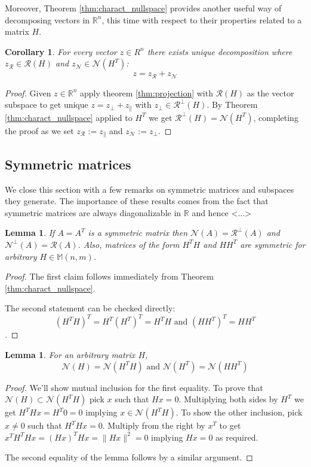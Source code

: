 \documentclass[a4paper]{article}
\theoremstyle{break}
\newtheorem{corollary}{Corollary}[theorem]
\newtheorem{lemma}[theorem]{Lemma}
\newcommand{\R}{\mathbb{R}}
\newcommand{\Nu}{\mathcal{N}}
\newcommand{\Ra}{\mathcal{R}}
\newcommand{\Mat}[2]{\mathbb{M}(#1, #2)}
\newcommand{\pll}{\parallel}
\begin{document}
Moreover, Theorem \ref{thm:charact_nullspace} provides another useful way of decomposing vectors in $\R^n$, this time with respect to their properties related to a matrix $H$.
\begin{corollary}
    For every vector $z \in R^n$ there exists unique decomposition where $z_\Ra \in \Ra(H)$ and $z_\Nu \in \Nu(H^T)$:
    $$z = z_\Ra + z_\Nu$$
\end{corollary}

\begin{proof}
    Given $ z \in \R^n$  apply theorem \ref{thm:projection} with $\Ra(H)$ as the vector subspace to get unique
    $ z = z_\perp + z_\pll$ with $z_\perp \in \Ra^\perp(H)$. By Theorem \ref{thm:charact_nullspace} applied to $H^T$ we get $\Ra^\perp(H) = \Nu(H^T)$, completing the proof as we set $z_\Ra := z_\pll$ and $z_\Nu := z_\perp$.
\end{proof}

\subsection{Symmetric matrices}
We close this section with a few remarks on symmetric matrices and subspaces they generate. The importance of these results comes from the fact that symmetric matrices are always diagonalizable in $\R$ and hence <...>

\begin{lemma} \label{lm:charact_sym_nullspace}
    If $A = A^T$ is a symmetric matrix then $\Nu(A) = \Ra^\perp(A)$ and $\Nu^\perp(A) = \Ra(A)$.
    Also, matrices of the form $H^T H$ and $H H^T$ are symmetric for arbitrary $H \in \Mat{n}{m}$.
\end{lemma}

\begin{proof}
    The first claim follows immediately from Theorem \ref{thm:charact_nullspace}.
    
    The second statement can be checked directly:
    $$(H^T H)^T = H^T (H^T)^T = H^T H \text{ and } (H H^T)^T = H H^T$$.
\end{proof}

\begin{lemma}
    \label{lem:nullspaces_hht}
    For an arbitrary matrix $H$,
    $$\Nu(H) = \Nu(H^T H) \text{ and } \Nu(H^T) = \Nu(H H^T)$$
\end{lemma}

\begin{proof}
    We'll show mutual inclusion for the first equality. To prove that $\Nu(H) \subset \Nu(H^T H)$ pick $x$ such that $Hx = 0$. Multiplying both sides by $H^T$ we get $ H^T H x = H^T 0 = 0 $ implying $x \in \Nu(H^T H) $. To show the other inclusion, pick $x \neq 0$ such that $H^T H x = 0$. Multiply from the right by $x^T$ to get $ x^T H^T H x = (Hx)^T Hx = \| Hx \|^2 = 0 $ implying $ Hx =0 $ as required.
    
    The second equality of the lemma follows by a similar argument.
\end{proof}
\end{document}

